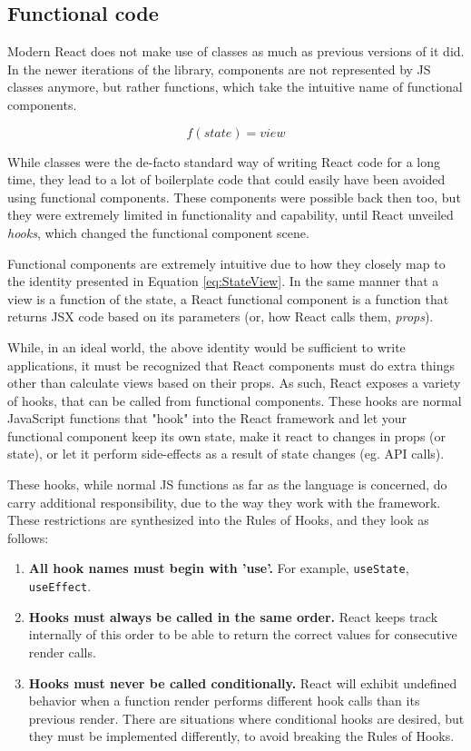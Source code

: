 \subsection{Functional code}
Modern React does not make use of classes as much as previous versions of it did. In the newer iterations of the library, components are not represented by JS classes anymore, but rather functions, which take the intuitive name of functional components.

\begin{equation}
    \label{eq:StateView}
    f(state) = view
\end{equation}

While classes were the de-facto standard way of writing React code for a long time, they lead to a lot of boilerplate code that could easily have been avoided using functional components. These components were possible back then too, but they were extremely limited in functionality and capability, until React unveiled \textit{hooks}, which changed the functional component scene.

Functional components are extremely intuitive due to how they closely map to the identity presented in Equation \ref{eq:StateView}. In the same manner that a view is a function of the state, a React functional component is a function that returns JSX code based on its parameters (or, how React calls them, \textit{props}).

While, in an ideal world, the above identity would be sufficient to write applications, it must be recognized that React components must do extra things other than calculate views based on their props. As such, React exposes a variety of hooks, that can be called from functional components. These hooks are normal JavaScript functions that "hook" into the React framework and let your functional component keep its own state, make it react to changes in props (or state), or let it perform side-effects as a result of state changes (eg. API calls).

These hooks, while normal JS functions as far as the language is concerned, do carry additional responsibility, due to the way they work with the framework. These restrictions are synthesized into the Rules of Hooks, and they look as follows:

\begin{enumerate}
    \item \textbf{All hook names must begin with 'use'.} For example, \verb|useState|, \verb|useEffect|.
    \item \textbf{Hooks must always be called in the same order.} React keeps track internally of this order to be able to return the correct values for consecutive render calls.
    \item \textbf{Hooks must never be called conditionally.} React will exhibit undefined behavior when a function render performs different hook calls than its previous render. There are situations where conditional hooks are desired, but they must be implemented differently, to avoid breaking the Rules of Hooks.
\end{enumerate}

